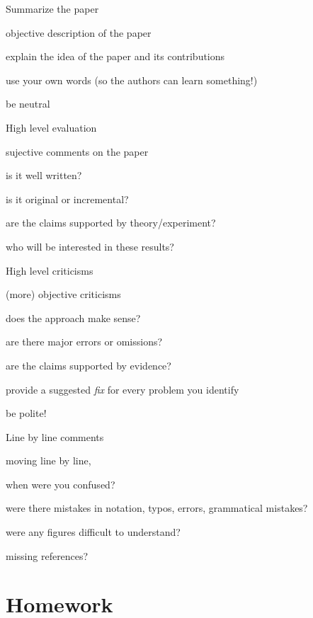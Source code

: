 \documentclass[presentation,xcolor={usenames,dvipsnames}]{beamer}
\begin{document}
\begin{frame}{Summarize the paper}

objective description of the paper
\bit
\item explain the idea of the paper and its contributions
\item use your own words (so the authors can learn something!)
\item be neutral
\eit

\end{frame}

\begin{frame}{High level evaluation}

sujective comments on the paper
\bit
\item is it well written?
\item is it original or incremental?
\item are the claims supported by theory/experiment?
\item who will be interested in these results?
\eit

\end{frame}

\begin{frame}{High level criticisms}

(more) objective criticisms
\bit
\item does the approach make sense?
\item are there major errors or omissions?
\item are the claims supported by evidence?
\item provide a suggested \emph{fix} for every problem you identify
\item be polite!
\eit

\end{frame}

\begin{frame}{Line by line comments}

moving line by line,
\bit
\item when were you confused?
\item were there mistakes in notation, typos, errors, grammatical mistakes?
\item were any figures difficult to understand?
\item missing references?
\eit

\end{frame}

\section{Homework}
\end{document}
